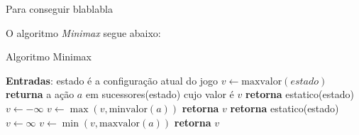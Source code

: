 \documentclass[a4paper,10pt]{article} %
\begin{document}
Para conseguir blablabla



O algoritmo \textit{Minimax} segue abaixo:

\begin{algorithm}
\caption{Algoritmo Minimax}\label{alg:minimax}
\begin{algorithmic}[1]
\State \textbf{Entradas}: estado é a configuração atual do jogo
\State $v\gets \mathrm{maxvalor}{(estado)}$
\State \textbf{returna} a ação $a$ em sucessores(estado) cujo valor é $v$ %
\EndFunction
{}
   \State \textbf{retorna} estatico(estado)
\EndIf
\State $v \gets -\infty$
    \State $v \gets \max{(v, \mathrm{minvalor}(a))}$
\EndFor
\State \textbf{retorna} $v$
\EndFunction
{}
   \State \textbf{retorna} estatico(estado)
\EndIf
\State $v \gets \infty$
    \State $v \gets \min{(v, \mathrm{maxvalor}(a))}$
\EndFor
\State \textbf{retorna} $v$
\EndFunction
\end{algorithmic}
\end{algorithm}
\end{document}
